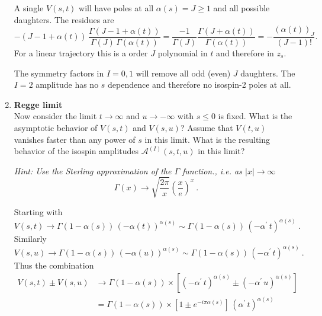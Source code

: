 \begin{enumerate}
          \begin{solution}
              A single $V(s,t)$ will have poles at all $\alpha(s) = J\geq 1$ and all possible daughters. The residues are
              \begin{equation}
                  - (J-1+\alpha(t)) \, \frac{\Gamma(J-1+\alpha(t))}{\Gamma(J) \, \Gamma(\alpha(t))} = \frac{-1}{\Gamma(J)} \frac{\Gamma(J+\alpha(t))}{\Gamma(\alpha(t))} = - \frac{(\alpha(t))_J}{(J-1)!}.
              \end{equation}
              For a linear trajectory this is a order $J$ polynomial in $t$ and therefore in $z_s$.

              The symmetry factors in $I=0,1$ will remove all odd (even) $J$ daughters. The $I=2$ amplitude has no $s$ dependence and therefore no isospin-2 poles at all.
          \end{solution}

    \item \textbf{Regge limit} \\
          Now consider the limit $t \to \infty$ and $u \to - \infty$ with $s \leq 0$ is fixed. What is the asymptotic behavior of $V(s,t)$ and $V(s,u)$? Assume that $V(t,u)$ vanishes faster than any power of $s$ in this limit. What is the resulting behavior of the isospin amplitudes $\mathcal{A}^{(I)}(s,t,u)$ in this limit?

          \noindent \textit{ Hint: Use the Sterling approximation of the $\Gamma$ function., i.e. as $|x|\to \infty$
              \begin{equation}
                  \Gamma(x) \to \sqrt{\frac{2\pi}{x}} \left( \frac{x}{e} \right)^x ~.
              \end{equation}
          }

          \begin{solution}
              Starting with
              \begin{equation}
                  V(s,t)  \to \Gamma(1-\alpha(s)) \, (-\alpha(t))^{\alpha(s)} \sim \Gamma(1-\alpha(s)) \, \left(-\alpha^\prime \, t\right)^{\alpha(s)} ~.
              \end{equation}
              Similarly
              \begin{equation}
                  V(s,u)  \to \Gamma(1-\alpha(s)) \, (-\alpha(u))^{\alpha(s)} \sim \Gamma(1-\alpha(s)) \, \left(-\alpha^\prime \, t\right)^{\alpha(s)} ~.
              \end{equation}
              Thus the combination
              \begin{align}
                  V(s,t) \pm V(s,u) & \to \Gamma(1-\alpha(s)) \times \left[\left(-\alpha^\prime \, t\right)^{\alpha(s)} \pm \left(-\alpha^\prime \, u\right)^{\alpha(s)} \right] \\
                                    & = \Gamma(1-\alpha(s)) \times \left[1\pm e^{-i\pi\alpha(s)}\right] \, \left(\alpha^\prime \, t\right)^{\alpha(s)}
              \end{align}
          \end{solution}


\end{enumerate}
